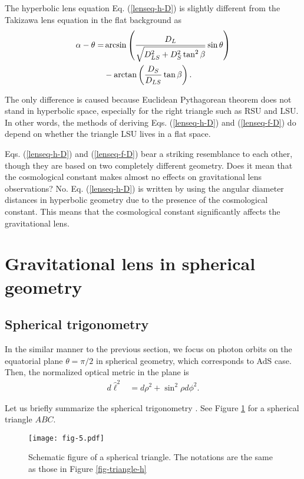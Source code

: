\documentclass[twocolumn,showpacs,preprintnumbers,amsmath,amssymb]{revtex4-1}
\begin{document}
The hyperbolic lens equation Eq. (\ref{lenseq-h-D}) 
is slightly different from the Takizawa lens equation in the flat background as 
\cite{Takizawa2020b} 
\begin{align}
\alpha - \theta 
=& 
\arcsin\left(
\frac{D_L}{\sqrt{D_{LS}^2 + D_S^2 \tan^2\beta}}
\sin\theta\right) 
\notag\\
& 
- 
\arctan\left(\frac{D_S}{D_{LS}}\tan\beta\right) .
\label{lenseq-f-D}
\end{align}

The only difference is caused because Euclidean Pythagorean theorem does not stand 
in hyperbolic space, especially for the right triangle such as RSU and LSU. 
In other words, 
the methods of deriving Eqs. (\ref{lenseq-h-D}) and (\ref{lenseq-f-D}) 
do depend on whether the triangle LSU lives in a flat space. 

Eqs. (\ref{lenseq-h-D}) and (\ref{lenseq-f-D}) bear a striking resemblance to each other, 
though they are based on two completely different geometry. 
Does it mean that the cosmological constant makes almost 
no effects on gravitational lens observations? 
No. 
Eq. (\ref{lenseq-h-D}) is written by using the angular diameter distances 
in hyperbolic geometry due to the presence of the cosmological constant. 
This means that the cosmological constant significantly affects 
the gravitational lens. 






\section{Gravitational lens in spherical geometry} 
\subsection{Spherical trigonometry} 
In the similar manner to the previous section, 
we focus on photon orbits on the equatorial plane $\theta = \pi/2$ 
in spherical geometry, which corresponds to AdS case. 
Then, the normalized optical metric in the plane is 
\begin{align}
d\hat\ell^2 
&= 
 d\rho^2
+ \sin^2\rho d\phi^2 . 
\label{optical-equatorial-AdS}
\end{align}




Let us briefly summarize the spherical trigonometry 
\cite{Ratcliffe-book}. 
See Figure \ref{fig-triangle-s} for a spherical triangle $ABC$. 

\begin{figure}
\texttt{[image: fig-5.pdf]}
\caption{
Schematic figure of a spherical triangle. 
The notations are the same as those in Figure \ref{fig-triangle-h}
}
\label{fig-triangle-s}
\end{figure}
\end{document}
